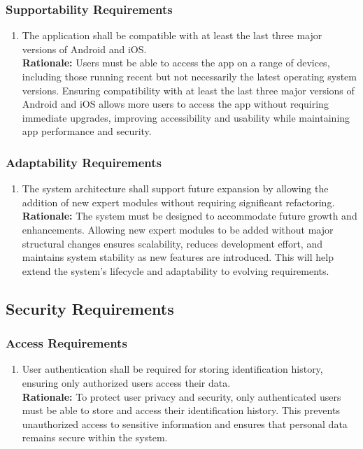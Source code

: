 \documentclass[]{article}
\begin{document}
\subsubsection{Supportability Requirements}
\label{ssub:supportability_requirements}
\begin{enumerate}[{MS-S}1. ]
	\item The application shall be compatible with at least the last three major versions of Android and iOS.
	\\ \textbf{Rationale:} Users must be able to access the app on a range of devices, including those running recent but not necessarily the latest operating system versions. Ensuring compatibility with at least the last three major versions of Android and iOS allows more users to access the app without requiring immediate upgrades, improving accessibility and usability while maintaining app performance and security.
\end{enumerate}

\subsubsection{Adaptability Requirements}
\label{ssub:adaptability_requirements}
\begin{enumerate}[{MS-A}1. ]
	\item The system architecture shall support future expansion by allowing the addition of new expert modules without requiring significant refactoring.
	\\ \textbf{Rationale:} The system must be designed to accommodate future growth and enhancements. Allowing new expert modules to be added without major structural changes ensures scalability, reduces development effort, and maintains system stability as new features are introduced. This will help extend the system’s lifecycle and adaptability to evolving requirements.
\end{enumerate}


\subsection{Security Requirements}
\label{sub:security_requirements}

\subsubsection{Access Requirements}
\label{ssub:access_requirements}
\begin{enumerate}[{SR-AC}1. ]
	\item User authentication shall be required for storing identification history, ensuring only authorized users access their data.
	\\ \textbf{Rationale:} To protect user privacy and security, only authenticated users must be able to store and access their identification history. This prevents unauthorized access to sensitive information and ensures that personal data remains secure within the system.
\end{enumerate}
\end{document}
